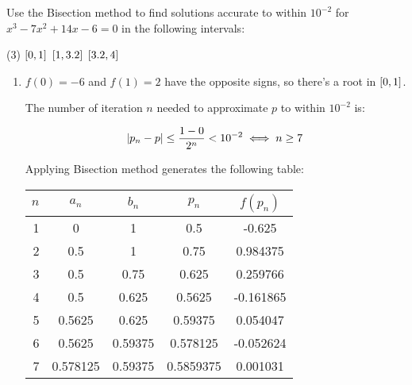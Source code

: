\documentclass[../../../../Assignments.tex]{subfiles}
\begin{document}
\begin{exercise}
    Use the Bisection method to find solutions accurate to within \(10^{-2}\)
    for \(x^3 - 7x^2 + 14x - 6 = 0\) in the following intervals:

    \begin{tasks}(3)
        \task \(\interval{0}{1}\)
        \task \(\interval{1}{\num{3.2}}\)
        \task \(\interval{\num{3.2}}{4}\)
    \end{tasks}
\end{exercise}

\begin{solution}
    \begin{enumerate}[label = (\alph*)]
        \item \(f(0) = -6\) and \(f(1) = 2\) have the opposite signs, so there's
            a root in \(\interval{0}{1}\).

            The number of iteration \(n\) needed to approximate \(p\) to within
            \(10^{-2}\) is:

            \[\abs{p_n - p} \leq \frac{1 - 0}{2^n} < 10^{-2} \iff n \geq 7\]

            Applying Bisection method generates the following table:

            \begin{table}[H]
                \centering
                \begin{tabular}{r S[table-format=1.6] S[table-format=1.5] S[table-format=1.7] S[table-format=-1.6]}
                    \toprule
                    \(n\)  &  {\(a_n\)}  &  {\(b_n\)}  &  {\(p_n\)}  &  {\(f(p_n)\)}  \\
                      &  0          &  1          &  0.5        &  -0.625        \\
                        2  &  0.5        &  1          &  0.75       &   0.984375     \\
                        3  &  0.5        &  0.75       &  0.625      &   0.259766     \\
                        4  &  0.5        &  0.625      &  0.5625     &  -0.161865     \\
                        5  &  0.5625     &  0.625      &  0.59375    &   0.054047     \\
                        6  &  0.5625     &  0.59375    &  0.578125   &  -0.052624     \\
                        7  &  0.578125   &  0.59375    &  0.5859375  &   0.001031     \\
                    \bottomrule
                \end{tabular}
            \end{table}


\end{enumerate}
\end{solution}
\end{document}
